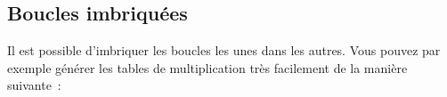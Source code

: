 \documentclass{magnolia}
\begin{document}




\subsection{Boucles imbriquées}

Il est possible d'imbriquer les boucles les unes dans les autres. Vous pouvez par exemple générer les tables de multiplication très facilement de la manière suivante~:
\end{document}
